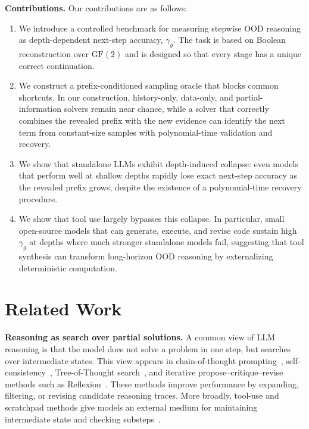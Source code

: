 \documentclass{article}
\begin{document}
{\bf Contributions.\enspace} Our contributions are as follows:
\begin{enumerate}[leftmargin=*,itemsep=0pt, parsep=0pt, topsep=0pt]
    \item We introduce a controlled benchmark for measuring stepwise OOD reasoning as depth-dependent next-step accuracy, $\gamma_g$. The task is based on Boolean reconstruction over $\mathrm{GF}(2)$ and is designed so that every stage has a unique correct continuation.

    \item We construct a prefix-conditioned sampling oracle that blocks common shortcuts. In our construction, history-only, data-only, and partial-information solvers remain near chance, while a solver that correctly combines the revealed prefix with the new evidence can identify the next term from constant-size samples with polynomial-time validation and recovery.

    \item We show that standalone LLMs exhibit depth-induced collapse: even models that perform well at shallow depths rapidly lose exact next-step accuracy as the revealed prefix grows, despite the existence of a polynomial-time recovery procedure.

    \item We show that tool use largely bypasses this collapse. In particular, small open-source models that can generate, execute, and revise code sustain high $\gamma_g$ at depths where much stronger standalone models fail, suggesting that tool synthesis can transform long-horizon OOD reasoning by externalizing deterministic computation.
\end{enumerate}

\section{Related Work}\label{sec:related}

\textbf{Reasoning as search over partial solutions.\enspace}
A common view of LLM reasoning is that the model does not solve a problem in one step, but searches over intermediate states. This view appears in chain-of-thought prompting~\citep{wei2022cot}, self-consistency~\citep{wang2022selfconsistency}, Tree-of-Thought search~\citep{yao2023tot}, and iterative propose--critique--revise methods such as Reflexion~\citep{shinn2023reflexion}. These methods improve performance by expanding, filtering, or revising candidate reasoning traces. More broadly, tool-use and scratchpad methods give models an external medium for maintaining intermediate state and checking substeps~\citep{nye2021workscratchpadsintermediatecomputation,schick2023toolformer,hao2023toolkengpt,parisi2022talmtoolaugmentedlanguage,10.1145/3696410.3714825}. 
\end{document}
